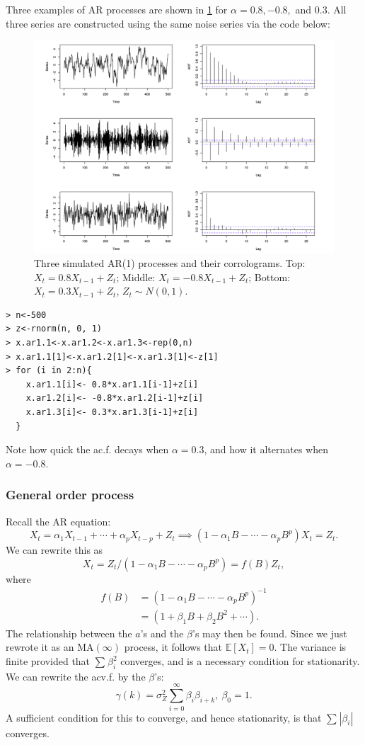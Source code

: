 Three examples of AR processes are shown in \cref{fig:3.4} for $\alpha = 0.8, -0.8,$ and $0.3$. All three series 
are constructed using the same noise series via the code below:

\begin{figure}[ht]
	\centering
	\includegraphics[width=\textwidth]{Chapter 3/fig3-4.png}
	\caption{Three simulated AR(1) processes and their corrolograms. Top: $X_t = 0.8X_{t-1} + Z_t$; Middle: 
	$X_t = -0.8X_{t-1} + Z_t$; Bottom: $X_t = 0.3X_{t-1} + Z_t$, $Z_t \sim N(0, 1)$.}
	\label{fig:3.4}
\end{figure}

\begin{verbatim}
> n<-500
> z<-rnorm(n, 0, 1)
> x.ar1.1<-x.ar1.2<-x.ar1.3<-rep(0,n)
> x.ar1.1[1]<-x.ar1.2[1]<-x.ar1.3[1]<-z[1]
> for (i in 2:n){
    x.ar1.1[i]<- 0.8*x.ar1.1[i-1]+z[i]
    x.ar1.2[i]<- -0.8*x.ar1.2[i-1]+z[i]
    x.ar1.3[i]<- 0.3*x.ar1.3[i-1]+z[i]
  }
\end{verbatim}

Note how quick the ac.f. decays when $\alpha = 0.3$, and how it alternates when $\alpha = -0.8$.


\subsubsection{General order process}
Recall the AR equation:
\[ X_t = \alpha_1 X_{t-1} + \cdots + \alpha_p X_{t-p} + Z_t \implies 
(1 - \alpha_1 B - \cdots - \alpha_p B^p) X_t = Z_t. \]
We can rewrite this as 
\[ X_t = Z_t / (1 - \alpha_1 B - \cdots - \alpha_p B^p) = f(B)Z_t, \]
where 
\begin{align*}
	f(B) 
	&= (1 - \alpha_1 B - \cdots - \alpha_p B^p)^{-1} \\
	&= (1 + \beta_1 B + \beta_2 B^2 + \cdots).
\end{align*}
The relationship between the $a$'s and the $\beta$'s may then be found. Since we just rewrote it as an 
$\mathrm{MA}(\infty)$ process, it follows that $\mathbb{E}\left[ X_t \right] = 0$. The variance is finite 
provided that $\sum_{}^{}\beta_i^2$ converges, and is a necessary condition for stationarity. We can rewrite 
the acv.f. by the $\beta$'s:
\[ \gamma(k) = \sigma_Z^2 \sum_{i = 0}^{\infty} \beta_i \beta_{i+k}, \ \beta_0 = 1. \]
A sufficient condition for this to converge, and hence stationarity, is that $\sum_{}^{}|\beta_i|$ converges.

